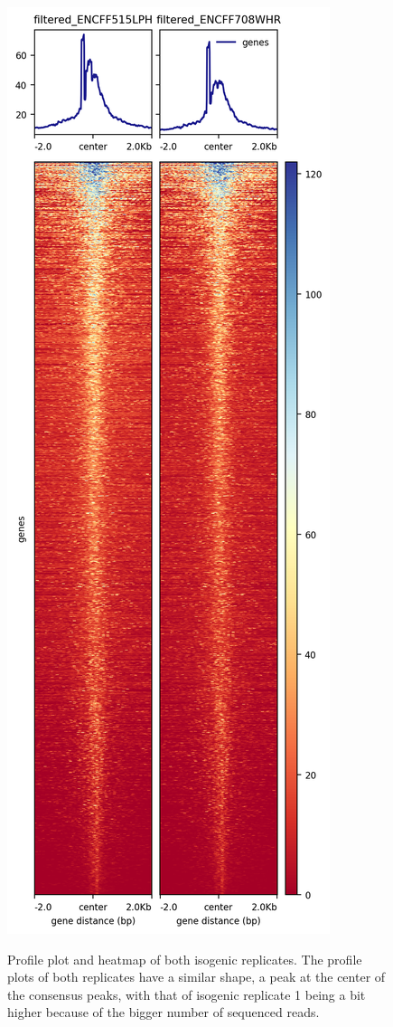 \documentclass{article}
\begin{document}
{\begin{figure}[H]
\centering
\includegraphics[height=\textheight]{heatmap.png}
\label{fig:heatmap}
\caption{Profile plot and heatmap of both isogenic replicates. The profile plots of both replicates have a similar shape, a peak at the center of the consensus peaks, with that of isogenic replicate 1 being a bit higher because of the bigger number of sequenced reads.}
\end{figure}

}
\end{document}
